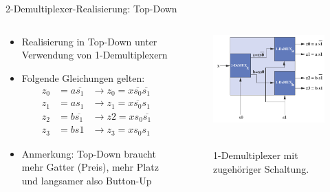 \documentclass[12pt%
,xcolor=table
,aspectratio=169%
]{beamer}
\begin{document}
\begin{frame}{2-Demultiplexer-Realisierung: Top-Down}
\begin{columns}[T] %
\begin{column}{.6\textwidth}
\begin{itemize}
		\item Realisierung in Top-Down unter Verwendung von 1-Demultiplexern
		\item Folgende Gleichungen gelten:
		\begin{align*}
		z_0 & = a\overline{s_1} & \to z_0 = x\overline{s_0} \overline{s_1} \\
		z_1 & = a s_1 & \to z_1 = x\overline{s_0} s_1 \\
		z_2 & =  b \overline{s_1} & \to z2 = x s_0 \overline{s_1}\\
		z_3 &= b s1 & \to z_3 = x s_0 s_1
		\end{align*}
		\item Anmerkung: Top-Down braucht mehr Gatter (Preis), mehr Platz und langsamer also Button-Up
	\end{itemize}
\end{column}%
\hfill%
\begin{column}{.48\textwidth}
\centering
\begin{figure}
\includegraphics[scale=0.3]{pictures/2demux_td}\
\caption{1-Demultiplexer mit zugehöriger Schaltung.}
\end{figure}
\end{column}%
\end{columns}
\end{frame}
\end{document}

